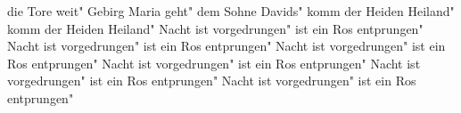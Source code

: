 \ifx\mxversion\undefined
  
  
  
  
\fi

%
\tableofcontents
\normalmusicsize
 die Tore weit"
 Gebirg Maria geht"
 dem Sohne Davids"
 komm der Heiden Heiland"
 komm der Heiden Heiland"
 Nacht ist vorgedrungen"
 ist ein Ros entprungen"
 Nacht ist vorgedrungen"
 ist ein Ros entprungen"
 Nacht ist vorgedrungen"
 ist ein Ros entprungen"
 Nacht ist vorgedrungen"
 ist ein Ros entprungen"
 Nacht ist vorgedrungen"
 ist ein Ros entprungen"
 Nacht ist vorgedrungen"
 ist ein Ros entprungen"

\bookbye